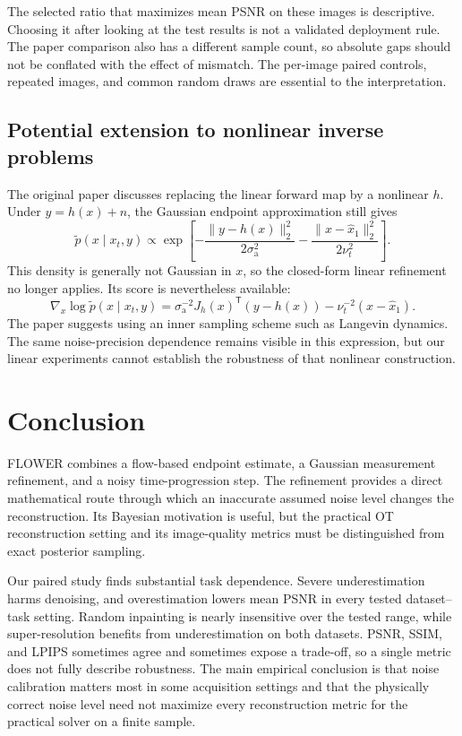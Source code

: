 \documentclass[10pt,letterpaper]{article}
\newcommand{\sa}{\sigma_{\mathrm a}}
\newcommand{\xhat}{\widehat{x}_1}
\begin{document}
The selected ratio that maximizes mean PSNR on these images is descriptive. Choosing it after looking at the test results is not a validated deployment rule. The paper comparison also has a different sample count, so absolute gaps should not be conflated with the effect of mismatch. The per-image paired controls, repeated images, and common random draws are essential to the interpretation.

\subsection{Potential extension to nonlinear inverse problems}
The original paper discusses replacing the linear forward map by a nonlinear $h$. Under $y=h(x)+n$, the Gaussian endpoint approximation still gives
\begin{equation}
 \widetilde p(x\mid x_t,y)\propto
 \exp\!\left[-\frac{\|y-h(x)\|_2^2}{2\sa^2}
             -\frac{\|x-\xhat\|_2^2}{2\nu_t^2}\right].
\end{equation}
This density is generally not Gaussian in $x$, so the closed-form linear refinement no longer applies. Its score is nevertheless available:
\begin{equation}
 \nabla_x\log\widetilde p(x\mid x_t,y)
 =\sa^{-2}J_h(x)^\mathsf{T}(y-h(x))-\nu_t^{-2}(x-\xhat).
\end{equation}
The paper suggests using an inner sampling scheme such as Langevin dynamics. The same noise-precision dependence remains visible in this expression, but our linear experiments cannot establish the robustness of that nonlinear construction.

\section{Conclusion}
FLOWER combines a flow-based endpoint estimate, a Gaussian measurement refinement, and a noisy time-progression step. The refinement provides a direct mathematical route through which an inaccurate assumed noise level changes the reconstruction. Its Bayesian motivation is useful, but the practical OT reconstruction setting and its image-quality metrics must be distinguished from exact posterior sampling.

Our paired study finds substantial task dependence. Severe underestimation harms denoising, and overestimation lowers mean PSNR in every tested dataset--task setting. Random inpainting is nearly insensitive over the tested range, while super-resolution benefits from underestimation on both datasets. PSNR, SSIM, and LPIPS sometimes agree and sometimes expose a trade-off, so a single metric does not fully describe robustness. The main empirical conclusion is that noise calibration matters most in some acquisition settings and that the physically correct noise level need not maximize every reconstruction metric for the practical solver on a finite sample.
\end{document}
